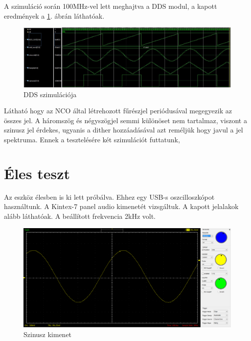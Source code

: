 \documentclass[a4paper,11pt]{article}
\begin{document}

A szimuláció során 100MHz-vel lett meghajtva a DDS modul, a kapott eredmények a \ref{a:simulation}. ábrán láthatóak.

\begin{figure}[h!]
	\begin{center}
		\includegraphics[scale=0.5]{simulation.JPG}	
	\end{center}
	\caption{DDS szimulációja}
	\label{a:simulation}
\end{figure}

Látható hogy az NCO által létrehozott fűrészjel periódusával megegyezik az összes jel. A háromszög és négyszögjel semmi különöset nem tartalmaz, viszont a szinusz jel érdekes, ugyanis a dither hozzáadásával azt reméljük hogy javul a jel spektruma. Ennek a tesztelésére két szimulációt futtatunk, 


\section{Éles teszt}

Az eszköz élesben is ki lett próbálva. Ehhez egy USB-s oszcilloszkópot használtunk. A Kintex-7 panel audio kimenetét vizsgáltuk. A kapott jelalakok alább láthatóak. A beállított frekvencia 2kHz volt.

\begin{figure}[H]
	\begin{center}
		\includegraphics[scale=0.25]{scope_sin.png}	
	\end{center}
	\caption{Szinusz kimenet}
	\label{a:sinout}
\end{figure}
\end{document}
